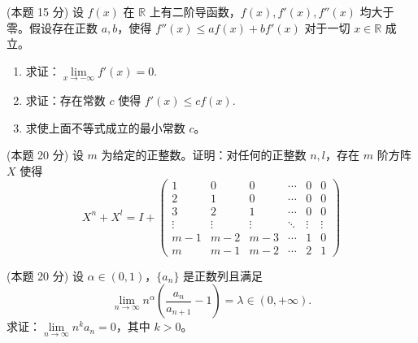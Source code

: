 \documentclass[loose]{ExBook}
\begin{document}
\begin{qitems}
    \begin{bbox}
        \qitem (本题 15 分) 设 \( f(x) \) 在 \( \mathbb{R} \) 上有二阶导函数，\( f(x), f'(x), f''(x) \) 均大于零。假设存在正数 \( a, b \)，使得 \( f''(x) \leq af(x) + bf'(x) \) 对于一切 \( x \in \mathbb{R} \) 成立。
        
        \begin{enumerate}[label=(\arabic*)]
            \item 求证：\( \lim\limits_{x \to -\infty} f'(x) = 0. \)
            \item 求证：存在常数 \( c \) 使得 \( f'(x) \leq cf(x). \)
            \item 求使上面不等式成立的最小常数 \( c \)。
        \end{enumerate}
    \end{bbox}
     \begin{bbox}
        \qitem (本题 20 分) 设 \( m \) 为给定的正整数。证明：对任何的正整数 \( n, l \)，存在 \( m \) 阶方阵 \( X \) 使得
        \[X^n + X^l = I + 
        \begin{pmatrix}
        1 & 0 & 0 & \cdots & 0 & 0 \\
        2 & 1 & 0 & \cdots & 0 & 0 \\
        3 & 2 & 1 & \cdots & 0 & 0 \\
        \vdots & \vdots & \vdots & \ddots & \vdots & \vdots \\
        m-1 & m-2 & m-3 & \cdots & 1 & 0 \\
        m & m-1 & m-2 & \cdots & 2 & 1
        \end{pmatrix}\]
    \end{bbox}

    \begin{bbox}
        \qitem (本题 20 分) 设 \( \alpha \in (0, 1) \)，\(\{a_n\}\) 是正数列且满足
        \[
        \lim\limits_{n \to \infty} n^\alpha \left( \frac{a_n}{a_{n+1}} - 1 \right) = \lambda \in (0, +\infty).
        \]
        求证：\(\lim\limits_{n \to \infty} n^k a_n = 0\)，其中 \( k > 0 \)。
    \end{bbox}
\end{qitems}
\end{document}
